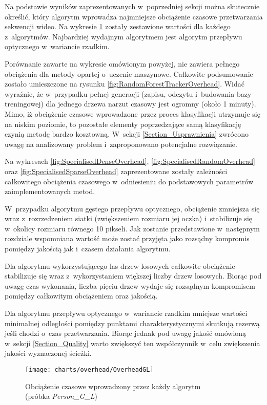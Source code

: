     Na podstawie wyników zaprezentowanych w~poprzedniej sekcji można skutecznie określić, który algorytm wprowadza najmniejsze obciążenie czasowe przetwarzania sekwencji wideo. Na wykresie \ref{fig:OverheadGL} zostały zestawione wartości dla każdego z~algorytmów. Najbardziej wydajnym algorytmem jest algorytm przepływu optycznego w~wariancie rzadkim.

    Porównanie zawarte na wykresie omówionym powyżej, nie zawiera pełnego obciążenia dla metody opartej o~uczenie maszynowe. Całkowite podsumowanie zostało umieszczone na rysunku \ref{fig:RandomForestTrackerOverhead}. Widać wyraźnie, że w~przypadku pełnej generacji (zapisu, odczytu i~budowania bazy treningowej) dla jednego drzewa narzut czasowy jest ogromny (około 1 minuty). Mimo, iż obciążenie czasowe wprowadzone przez proces klasyfikacji utrzymuje się na niskim poziomie, to pozostałe elementy poprzedzające samą klasyfikację czynią metodę bardzo kosztowną. W~sekcji \ref{Section_Usprawnienia} zwrócono uwagę na analizowany problem i~zaproponowano potencjalne rozwiązanie.

    Na wykresach \ref{fig:SpecialisedDenseOverhead}, \ref{fig:SpecialisedRandomOverhead} oraz \ref{fig:SpecialisedSparseOverhead} zaprezentowane zostały zależności całkowitego obciążenia czasowego w~odniesieniu do podstawowych parametrów zaimplementowanych metod.

    W~przypadku algorytmu gęstego przepływu optycznego, obciążenie zmniejsza się wraz z~rozrzedzeniem siatki (zwiększeniem rozmiaru jej oczka) i~stabilizuje się w~okolicy rozmiaru równego 10 pikseli. Jak zostanie przedstawione w~następnym rozdziale wspomniana wartość może zostać przyjęta jako rozsądny kompromis pomiędzy jakością jak i~czasem działania algorytmu.

    Dla algorytmu wykorzystującego las drzew losowych całkowite obciążenie stabilizuje się wraz z~wykorzystaniem większej liczby drzew losowych. Biorąc pod uwagę czas wykonania, liczba pięciu drzew wydaje się rozsądnym kompromisem pomiędzy całkowitym obciążeniem oraz jakością.

    Dla algorytmu przepływu optycznego w~wariancie rzadkim mniejsze wartości minimalnej odległości pomiędzy punktami charakterystycznymi skutkują rezerwą jeśli chodzi o~czas przetwarzania. Biorąc jednak pod uwagę jakość omówioną w~sekcji \ref{Section_Quality} warto zwiększyć ten współczynnik w~celu zwiększenia jakości wyznaczonej ścieżki.

    \newpage
      \begin{figure}[!ht]
        \centering
        \texttt{[image: charts/overhead/OverheadGL]}
        \caption[Obciążenie czasowe wprowadzony przez każdy algorytm]
                {Obciążenie czasowe wprowadzony przez każdy algorytm\\(próbka \textit{Person\_G\_L})}
        \label{fig:OverheadGL}
      \end{figure}

